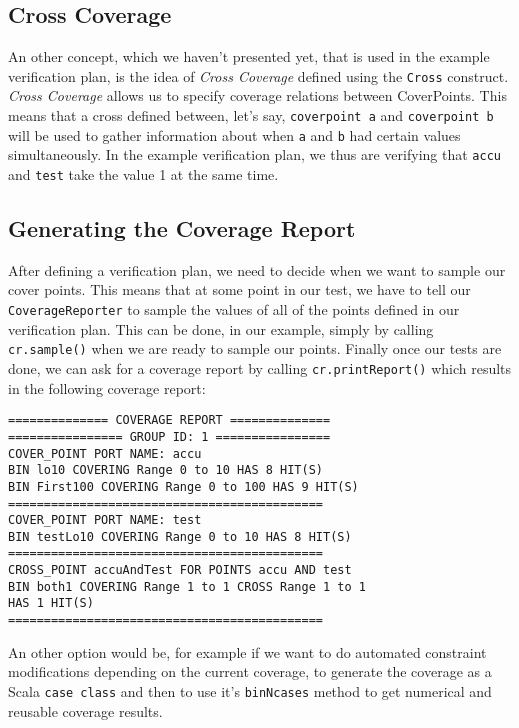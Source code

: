 \documentclass[conference]{IEEEtran}
\begin{document}
\subsection{Cross Coverage}
An other concept, which we haven't presented yet, that is used in the example verification plan, is the idea of \textit{Cross Coverage} defined using the \texttt{Cross} construct. \textit{Cross Coverage} allows us to specify coverage relations between CoverPoints. This means that a cross defined between, let's say, \texttt{coverpoint a} and \texttt{coverpoint b} will be used to gather information about when \texttt{a} and \texttt{b} had certain values simultaneously. In the example verification plan, we thus are verifying that \texttt{accu} and \texttt{test} take the value 1 at the same time.

\subsection{Generating the Coverage Report}
After defining a verification plan, we need to decide when we want to sample our cover points. This means that at some point in our test, we have to tell our \texttt{CoverageReporter} to sample the values of all of the points defined in our verification plan. This can be done, in our example, simply by calling \texttt{cr.sample()} when we are ready to sample our points. Finally once our tests are done, we can ask for a coverage report by calling \texttt{cr.printReport()} which results in the following coverage report: 
\begin{verbatim}
============== COVERAGE REPORT ==============
================ GROUP ID: 1 ================
COVER_POINT PORT NAME: accu
BIN lo10 COVERING Range 0 to 10 HAS 8 HIT(S)
BIN First100 COVERING Range 0 to 100 HAS 9 HIT(S)
============================================
COVER_POINT PORT NAME: test
BIN testLo10 COVERING Range 0 to 10 HAS 8 HIT(S)
============================================
CROSS_POINT accuAndTest FOR POINTS accu AND test
BIN both1 COVERING Range 1 to 1 CROSS Range 1 to 1 
HAS 1 HIT(S)
============================================
\end{verbatim}
An other option would be, for example if we want to do automated constraint modifications depending on the current coverage, to generate the coverage as a Scala \texttt{case class} and then to use it's \texttt{binNcases} method to get numerical and reusable coverage results.  
  
\end{document}
